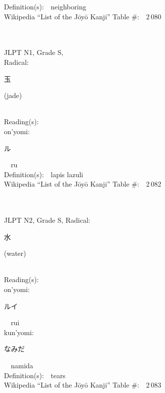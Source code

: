 \begin{multicols}{2}
Definition(s):\ \ neighboring \\
Wikipedia ``List of the J\=oy\=o Kanji'' Table \#:\ \ 2\,080 \\
\ \ \\
{\fontsize{34pt}{40pt}  }\ \ \\
{JLPT N1, Grade S, \\Radical:\ \ {\begin{CJK}{UTF8}{min} 玉 \end{CJK}} (jade) } \\
Reading(s):\ \ \\
{\hspace*{1em}}on'yomi:\ \ \\
{\hspace*{2em}}{\begin{CJK}{UTF8}{min} ル \end{CJK}}\ \ ru\ \ \\
Definition(s):\ \ lapis lazuli \\
Wikipedia ``List of the J\=oy\=o Kanji'' Table \#:\ \ 2\,082 \\
\ \ \\
{\fontsize{34pt}{40pt}  }\ \ \\  %
{JLPT N2, Grade S, Radical:\ \ {\begin{CJK}{UTF8}{min} 水 \end{CJK}} (water) } \\
Reading(s):\ \ \\
{\hspace*{1em}}on'yomi:\ \ \\
{\hspace*{2em}}{\begin{CJK}{UTF8}{min} ルイ \end{CJK}}\ \ rui\ \ \\
{\hspace*{1em}}kun'yomi:\ \ \\
{\hspace*{2em}}{\begin{CJK}{UTF8}{min} なみだ \end{CJK}}\ \ namida\ \ \\
Definition(s):\ \ tears \\
Wikipedia ``List of the J\=oy\=o Kanji'' Table \#:\ \ 2\,083 \\

\end{multicols}
